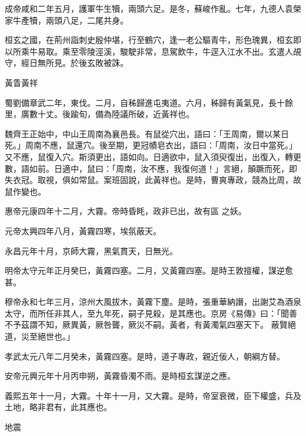 \begin{pinyinscope}
 成帝咸和二年五月，護軍牛生犢，兩頭六足。是冬，蘇峻作亂。七年，九德人袁榮家牛產犢，兩頭八足，二尾共身。



 桓玄之國，在荊州詣刺史殷仲堪，行至鶴穴，逢一老公驅青牛，形色瑰異，桓玄即以所乘牛易取。乘至零陵涇溪，駿駛非常，息駕飲牛，牛逕入江水不出。玄遣人覘守，經日無所見。於後玄敗被誅。



 黃眚黃祥



 蜀劉備章武二年，東伐。二月，自秭歸進屯夷道。六月，秭歸有黃氣見，長十餘里，廣數十丈。後踰旬，備為陸議所破，近黃祥也。



 魏齊王正始中，中山王周南為襄邑長。有鼠從穴出，語曰：「王周南，爾以某日死。」周南不應，鼠還穴。後至期，更冠幘皂衣出，語曰：「周南，汝日中當死。」又不應，鼠復入穴。斯須更出，語如向。日適欲中，鼠入須臾復出，出復入，轉更數，語如前。日適中，鼠曰：「周南，汝不應，我復何道！」言絕，顛蹶而死，即失衣冠。取視，俱如常鼠。案班固說，此黃祥也。是時，曹爽專政，競為比周，故鼠作變也。


惠帝元康四年十二月，大霧。帝時昏眊，政非已出，故有區
 之妖。



 元帝太興四年八月，黃霧四寒，埃氛蔽天。



 永昌元年十月，京師大霧，黑氣貫天，日無光。



 明帝太守元年正月癸巳，黃霧四塞。二月，又黃霧四塞。是時王敦擅權，謀逆愈甚。



 穆帝永和七年三月，涼州大風拔木，黃霧下塵。是時，張重華納譖，出謝艾為酒泉太守，而所任非其人，至九年死，嗣子見殺，是其應也。京房《易傳》曰：「聞善不予茲謂不知，厥異黃，厥咎聾，厥災不嗣。黃者，有黃濁氣四塞天下。
 蔽賢絕道，災至絕世也。」



 孝武太元八年二月癸未，黃霧四塞。是時，道子專政，親近佞人，朝綱方替。



 安帝元興元年十月丙申朔，黃霧昏濁不雨。是時桓玄謀逆之應。



 義熙五年十一月，大霧。十年十一月，又大霧。是時，帝室衰微，臣下權盛，兵及土地，略非君有，此其應也。



 地震




\end{pinyinscope}
